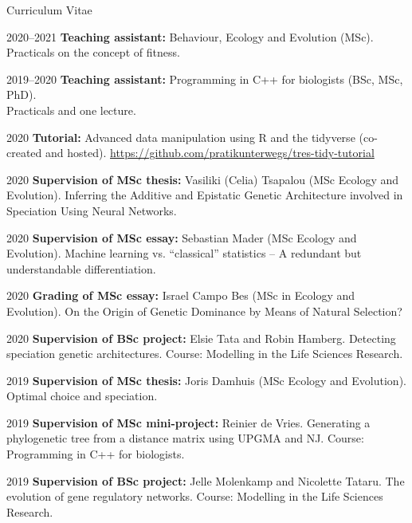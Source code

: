 \documentclass[11pt,a4paper]{article}
\begin{document}
\begin{cv}{Curriculum Vitae}
\begin{cvlist}{}
			\item[2020--2021] \textbf{Teaching assistant:} Behaviour, Ecology and Evolution (MSc).\\
			Practicals on the concept of fitness. 
			
			\item[2019--2020] \textbf{Teaching assistant:} Programming in C++ for biologists (BSc, MSc, PhD).\\ Practicals and one lecture. 
			
			\item[2020] \textbf{Tutorial:} Advanced data manipulation using R and the tidyverse (co-created and hosted). \url{https://github.com/pratikunterwegs/tres-tidy-tutorial}
			
			\item[2020] \textbf{Supervision of MSc thesis:} Vasiliki (Celia) Tsapalou (MSc Ecology and Evolution).
			Inferring the Additive and Epistatic Genetic Architecture involved in Speciation Using Neural Networks.
			
			\item[2020] \textbf{Supervision of MSc essay:} Sebastian Mader (MSc Ecology and Evolution).
			Machine learning vs. “classical” statistics – A redundant but understandable differentiation.
			
			\item[2020] \textbf{Grading of MSc essay:} Israel Campo Bes (MSc in Ecology and Evolution).
			On the Origin of Genetic Dominance by Means of Natural Selection?
			
			\item[2020] \textbf{Supervision of BSc project:} Elsie Tata and Robin Hamberg.
			Detecting speciation genetic architectures. Course: Modelling in the Life Sciences Research.
			
			\item[2019] \textbf{Supervision of MSc thesis:} Joris Damhuis (MSc Ecology and Evolution).
			Optimal choice and speciation.
			
			\item[2019] \textbf{Supervision of MSc mini-project:} Reinier de Vries.
			Generating a phylogenetic tree from a distance matrix using UPGMA and NJ. Course: Programming in C++ for biologists.
	
			\item[2019] \textbf{Supervision of BSc project:} Jelle Molenkamp and Nicolette Tataru. The evolution of gene regulatory networks. Course: Modelling in the Life Sciences Research.
			

\end{cvlist}
\end{cv}
\end{document}
